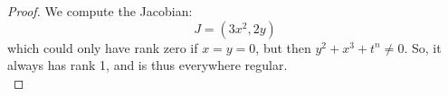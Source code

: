 \begin{proof}
	We compute the Jacobian:
	\[ J = (3x^2,2y) \]
	which could only have rank zero if $x=y=0$, but then $y^2+x^3+t^n \neq 0$. So, it always has rank 1, and is thus everywhere regular. \\
	
	
\end{proof}
